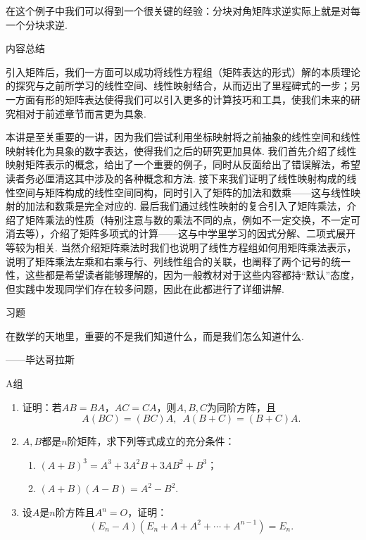 在这个例子中我们可以得到一个很关键的经验：分块对角矩阵求逆实际上就是对每一个分块求逆.

\vspace{2ex}
\centerline{\heiti \Large 内容总结}

引入矩阵后，我们一方面可以成功将线性方程组（矩阵表达的形式）解的本质理论的探究与之前所学习的线性空间、线性映射结合，从而迈出了里程碑式的一步；另一方面有形的矩阵表达使得我们可以引入更多的计算技巧和工具，使我们未来的研究相对于前述章节而言更为具象.

本讲是至关重要的一讲，因为我们尝试利用坐标映射将之前抽象的线性空间和线性映射转化为具象的数字表达，使得我们之后的研究更加具体. 我们首先介绍了线性映射矩阵表示的概念，给出了一个重要的例子，同时从反面给出了错误解法，希望读者务必厘清这其中涉及的各种概念和方法. 接下来我们证明了线性映射构成的线性空间与矩阵构成的线性空间同构，同时引入了矩阵的加法和数乘——这与线性映射的加法和数乘是完全对应的. 最后我们通过线性映射的复合引入了矩阵乘法，介绍了矩阵乘法的性质（特别注意与数的乘法不同的点，例如不一定交换，不一定可消去等），介绍了矩阵多项式的计算——这与中学里学习的因式分解、二项式展开等较为相关. 当然介绍矩阵乘法时我们也说明了线性方程组如何用矩阵乘法表示，说明了矩阵乘法左乘和右乘与行、列线性组合的关联，也阐释了两个记号的统一性，这些都是希望读者能够理解的，因为一般教材对于这些内容都持``默认''态度，但实践中发现同学们存在较多问题，因此在此都进行了详细讲解.

\vspace{2ex}
\centerline{\heiti \Large 习题}

\vspace{2ex}
{\kaishu 在数学的天地里，重要的不是我们知道什么，而是我们怎么知道什么.}
\begin{flushright}
    \kaishu
    ——毕达哥拉斯
\end{flushright}

\centerline{\heiti A组}
\begin{enumerate}
    \item 证明：若$AB=BA$，$AC=CA$，则$A,B,C$为同阶方阵，且
          \[A(BC)=(BC)A,\enspace A(B+C)=(B+C)A.\]

    \item $A,B$都是$n$阶矩阵，求下列等式成立的充分条件：
          \begin{enumerate}
              \item $(A+B)^3=A^3+3A^2B+3AB^2+B^3$；

              \item $(A+B)(A-B)=A^2-B^2$.
          \end{enumerate}

    \item 设$A$是$n$阶方阵且$A^n=O$，证明：
          \[(E_n-A)(E_n+A+A^2+\cdots+A^{n-1})=E_n.\]
\end{enumerate}

